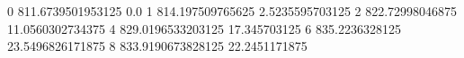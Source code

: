 0 811.6739501953125 0.0
1 814.197509765625 2.5235595703125
2 822.72998046875 11.0560302734375
4 829.0196533203125 17.345703125
6 835.2236328125 23.5496826171875
8 833.9190673828125 22.2451171875
